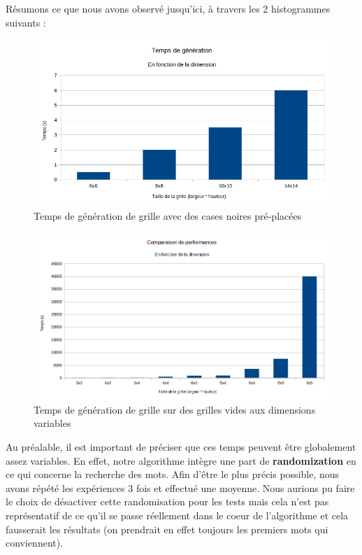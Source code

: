 \documentclass [ 11 pt ] {article}
\begin{document}
    Résumons ce que nous avons observé jusqu'ici, à travers les 2 histogrammes suivants :
    
    \begin{figure}[H] 
    \center 
    \includegraphics[width=0.7\linewidth]{grid_pattern.png}
    \caption{Temps de génération de grille avec des cases noires pré-placées}
    \end{figure}
    
    \begin{figure}[H] 
    \center 
    \includegraphics[width=0.7\linewidth]{grid_pattern_var.png}
    \caption{Temps de génération de grille sur des grilles vides aux dimensions variables}
    \end{figure}
    
    Au préalable, il est important de préciser que ces temps peuvent être globalement assez variables. En effet, notre algorithme intègre une part de \textbf{randomization} en ce qui concerne la recherche des mots. Afin d'être le plus précis possible, nous avons répété les expériences 3 fois et effectué une moyenne. Nous aurions pu faire le choix de désactiver cette randomisation pour les tests mais cela n'est pas représentatif de ce qu'il se passe réellement dans le coeur de l'algorithme et cela fausserait les résultats (on prendrait en effet toujours les premiers mots qui conviennent). \\
    
\end{document}
